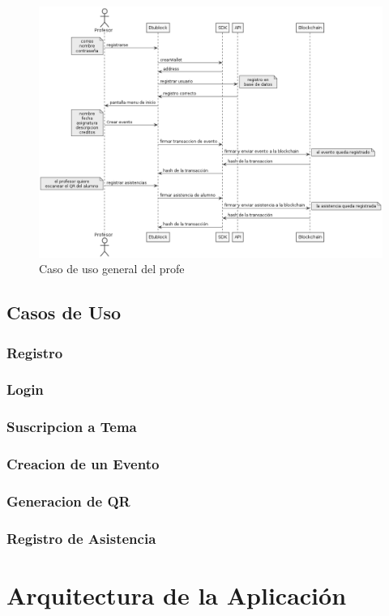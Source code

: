 \begin{figure}[h!]
  \centering
  \includegraphics[width=0.4\linewidth]{figs/Desarrollo/CasosUso/generalProfe}
  \caption[Caso de uso general del profe]{Caso de uso general del profe}
  \label{fig:uso_profe}
\end{figure}

\subsection{Casos de Uso}
\label{sec:casosUso}

\subsubsection{Registro}
\subsubsection{Login}
\subsubsection{Suscripcion a Tema}
\subsubsection{Creacion de un Evento}
\subsubsection{Generacion de QR}
\subsubsection{Registro de Asistencia}


\section{Arquitectura de la Aplicación}


